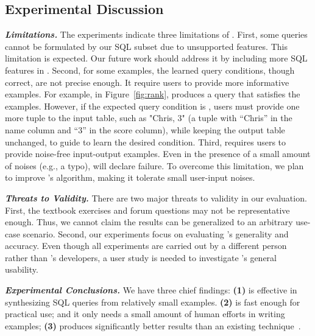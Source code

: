 \vspace{-1mm}
\subsection{Experimental Discussion}
\vspace{-1mm}

\enlargethispage{5pt}

\noindent \textbf{\textit{Limitations.}}
The experiments indicate three limitations
of \ourtool. First, some queries
cannot be formulated by our SQL subset
due to unsupported features. This limitation is expected.
Our future work
should address it by including more SQL
features in \ourtool.
Second, for some examples, the learned query
conditions, though correct, are not precise
enough. It require users to provide more informative examples.
For example, in Figure~\ref{fig:rank}, \ourtool produces a 
query 
that satisfies the examples. However, if
the expected query condition 
is , users must provide
one more tuple to the input table, such as "Chris, 3"
(a tuple with ``Chris'' in the name column and ``3''
in the score column), while keeping the output table
unchanged, 
to guide \ourtool to learn the desired condition.
Third, \ourtool requires
users to provide noise-free input-output examples.
Even in the presence of a small amount of 
noises (e.g., a typo), \ourtool will declare failure.
To overcome this limitation, we plan to improve \ourtool
's algorithm, making it tolerate small user-input noises.

\vspace{.5mm}
\noindent \textbf{\textit{Threats to Validity.}}
There are two major threats to validity
in our evaluation. First, the \exnum textbook exercises
and \pnum forum questions
may not be representative enough.
Thus, we cannot claim the results can be generalized to an
arbitrary use-case scenario. Second, our
experiments focus on evaluating \ourtool's generality 
and accuracy. Even though all experiments are carried
out by a different person rather than \ourtool's developers,
a user study is needed to investigate
\ourtool's general usability.


\vspace{.5mm}
\noindent \textbf{\textit{Experimental Conclusions.}}
We have three chief findings: \textbf{(1)}
\ourtool is effective in synthesizing SQL queries
from relatively small examples.
\textbf{(2)} \ourtool is fast enough for practical use;
and it only needs a small amount of human
efforts in writing examples;
\textbf{(3)} \ourtool produces significantly better results
than an existing technique~\cite{Tran:2009}.




